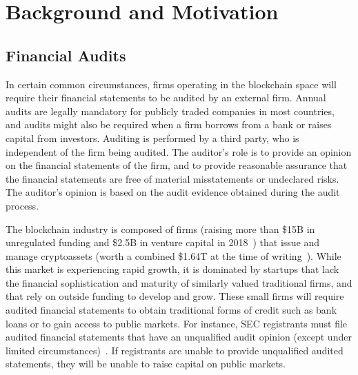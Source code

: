 






\section{Background and Motivation} \label{sec:auditing:background}

\subsection{Financial Audits}

In certain common circumstances, firms operating in the blockchain space will require their financial statements to be audited by an external firm. Annual audits are legally mandatory for publicly traded companies in most countries, and audits might also be required when a firm borrows from a bank or raises capital from investors. Auditing is performed by a third party, who is independent of the firm being audited. The auditor's role is to provide an opinion on the financial statements of the firm, and to provide reasonable assurance that the financial statements are free of material misstatements or undeclared risks. The auditor's opinion is based on the audit evidence obtained during the audit process.


The blockchain industry is composed of firms (raising more than \$15B in unregulated funding and \$2.5B in venture capital in 2018~\cite{coindesk2018}) that issue and manage cryptoassets (worth a combined \$1.64T at the time of writing~\cite{coinmarketcap}). While this market is experiencing rapid growth, it is dominated by startups that lack the financial sophistication and maturity of similarly valued traditional firms, and that rely on outside funding to develop and grow. These small firms will require audited financial statements to obtain traditional forms of credit such as bank loans or to gain access to public markets. For instance, SEC registrants must file audited financial statements that have an unqualified audit opinion (except under limited circumstances)~\cite{securities2009financial}. If registrants are unable to provide unqualified audited statements, they will be unable to raise capital on public markets. 

